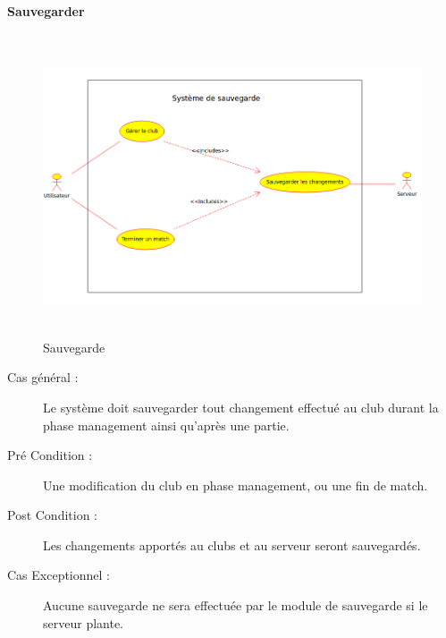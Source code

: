 \documentclass[a4paper]{article}
\begin{document}
\paragraph{Sauvegarder}
\begin{figure}[h]
   \caption{\label{1} Sauvegarde}
   \begin{center}
   \includegraphics[height=250pt]{uml/svg.png}
   \end{center}
\end{figure}
\begin{description}
\item[Cas général :] Le système doit sauvegarder tout changement effectué au \gls{club} durant la phase management ainsi qu'après une partie.
\item[Pré Condition  :] Une modification du \gls{club} en phase management, ou une fin de match.
\item[Post Condition :] Les changements apportés au \glspl{club} et au serveur seront sauvegardés.
\item[Cas Exceptionnel :] Aucune sauvegarde ne sera effectuée par le module de sauvegarde si le \gls{serveur} plante.
\end{description}
\end{document}
